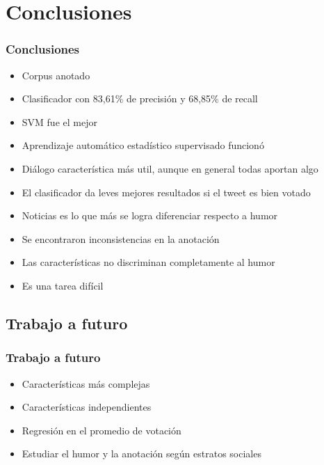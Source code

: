 \section{Conclusiones}

\begin{frame}
    \frametitle{Conclusiones}
    
    \begin{itemize}[<+->]
    	\item[\checkmark] Corpus anotado
    	\item[\checkmark] Clasificador con 83,61\% de precisión y 68,85\% de recall
    	\item[\checkmark] SVM fue el mejor
    	\item[\checkmark] Aprendizaje automático estadístico supervisado funcionó
    	\item[\checkmark] Diálogo característica más util, aunque en general todas aportan algo
    	\item[\checkmark] El clasificador da leves mejores resultados si el tweet es bien votado
    	\item[\checkmark] Noticias es lo que más se logra diferenciar respecto a humor
    	\item[\checkmark] Se encontraron inconsistencias en la anotación
    	\item[\checkmark] Las características no discriminan completamente al humor
    	\item[\checkmark] Es una tarea difícil
    \end{itemize}
\end{frame}

\subsection{Trabajo a futuro}
\begin{frame}
    \frametitle{Trabajo a futuro}
    
    \begin{itemize}[<+->]
    	\item Características más complejas
    	\item Características independientes
    	\item Regresión en el promedio de votación
    	\item Estudiar el humor y la anotación según estratos sociales
    \end{itemize}
\end{frame}
